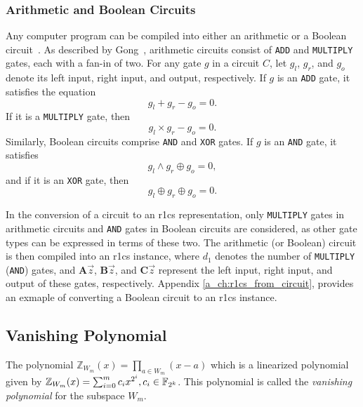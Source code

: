 \subsubsection{Arithmetic and Boolean Circuits}
Any computer program can be compiled into either an arithmetic or a Boolean circuit~\cite{Parno2016Pinocchio}. As described by Gong~\cite{Gong2024}, arithmetic circuits consist of \texttt{ADD} and \texttt{MULTIPLY} gates, each with a fan-in of two. For any gate $g$ in a circuit $C$, let $g_l$, $g_r$, and $g_o$ denote its left input, right input, and output, respectively. If $g$ is an \texttt{ADD} gate, it satisfies the equation 
\[
g_l + g_r - g_o = 0.
\]
If it is a \texttt{MULTIPLY} gate, then 
\[
g_l \times g_r - g_o = 0.
\]
Similarly, Boolean circuits comprise \texttt{AND} and \texttt{XOR} gates. If $g$ is an \texttt{AND} gate, it satisfies
\[
g_l \wedge g_r \oplus g_o = 0,
\]
and if it is an \texttt{XOR} gate, then 
\[
g_l \oplus g_r \oplus g_o = 0.
\]


In the conversion of a circuit to an \gls{r1cs} representation, only \texttt{MULTIPLY} gates in arithmetic circuits and \texttt{AND} gates in Boolean circuits are considered, as other gate types can be expressed in terms of these two. The arithmetic (or Boolean) circuit is then compiled into an \gls{r1cs} instance, where $d_1$ denotes the number of \texttt{MULTIPLY} (\texttt{AND}) gates, and $\mathbf{A} \vec{z}$, $\mathbf{B} \vec{z}$, and $\mathbf{C} \vec{z}$ represent the left input, right input, and output of these gates, respectively. Appendix \ref{a_ch:r1cs_from_circuit}, provides an exmaple of converting a Boolean circuit to an \gls{r1cs}  instance.







\subsection{Vanishing Polynomial} \label{sec:prel_vanishing}
\begin{definition}
	The polynomial $\mathbb{Z}_{W_{m}}(x)= \prod_{a\in W_m}^{} (x-a)$ which is a linearized polynomial given by $\mathbb{Z}_{W_{m}}(x) = \sum_{i=0}^{m} c_i x^{2^i}, c_i \in {\mathbb F}_{2^k}$. This polynomial is called the \textit{vanishing polynomial} for the subspace $W_m$.
\end{definition}

